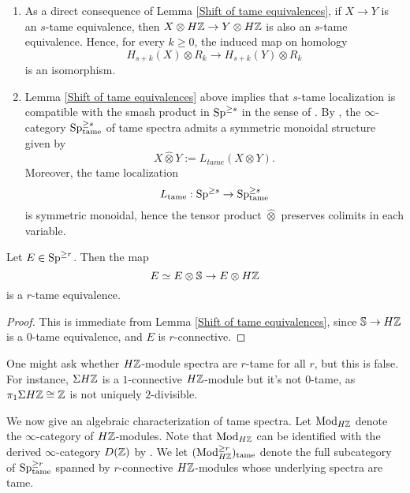 \begin{remark}
\label{symmetric monoidal structure on tame spectra}
\begin{enumerate}

 	\item As a direct consequence of Lemma \ref{Shift of tame equivalences}, if $X\to Y$ is an $s$-tame equivalence, then $X\otimes H{\mathbb{Z}} \to Y\otimes H{\mathbb{Z}}$ is also an $s$-tame equivalence. Hence, for every $k\geq 0$, the induced map on homology
 	\[
 	H_{s+k}(X)\otimes R_{k}
 	\to
 	H_{s+k}(Y)\otimes R_{k}
 	\]
 	is an isomorphism.
	\item Lemma \ref{Shift of tame equivalences} above implies that $s$-tame localization is compatible with the smash product in $\operatorname{Sp}^{\geq s}$ in the sense of \cite[Definition 2.2.1.6.]{HA}. By \cite[Proposition 2.2.1.9.]{HA}, the $\infty$-category $\operatorname{Sp}^{\geq s}_{\operatorname{\operatorname{tame}}}$ of tame spectra admits a symmetric monoidal structure given by 
$$
X\hat{\otimes} Y := L_{tame}(X\otimes Y).
$$
Moreover, the tame localization 
$$
L_{\operatorname{\operatorname{tame}}}: \operatorname{Sp}^{\geq s} \to 
\operatorname{Sp}^{\geq s}_{\operatorname{\operatorname{tame}}}
$$
is symmetric monoidal, hence the tensor product $\hat{\otimes}$ preserves colimits in each variable.
\end{enumerate}

\end{remark}

\begin{corollary}
\label{HZ commutes with tame localization}
	Let $E\in \operatorname{Sp}^{\geq r}$. Then the map
	$$
	E \simeq E\otimes {\mathbb{S}}  \to E\otimes H{\mathbb{Z}}
	$$ 
	is a $r$-tame equivalence.
\end{corollary}
\begin{proof}
	This is immediate from Lemma \ref{Shift of tame equivalences}, since ${\mathbb{S}} \to H{\mathbb{Z}}$ is a $0$-tame equivalence, and $E$ is $r$-connective.
\end{proof}



One might ask whether $H{\mathbb{Z}}$-module spectra are $r$-tame for all $r$, but this is false. For instance, $\Sigma H{\mathbb{Z}}$ is a $1$-connective $H{\mathbb{Z}}$-module but it's not $0$-tame, as $\pi_{1}\Sigma H{\mathbb{Z}}\cong {\mathbb{Z}}$ is not uniquely $2$-divisible.

We now give an algebraic characterization of tame spectra. 
Let $\operatorname{Mod}_{H{\mathbb{Z}}}$ denote the $\infty$-category of $H{\mathbb{Z}}$-modules. Note that $\operatorname{Mod}_{H{\mathbb{Z}}}$ can be identified with the derived $\infty$-category $D({\mathbb{Z}})$ by \cite[Remark 7.1.1.16.]{HA}.
We let $(\operatorname{Mod}^{\geq r}_{H{\mathbb{Z}}})_{\operatorname{\operatorname{tame}}}$ denote the full subcategory of $\operatorname{Sp}^{\geq r}_{\operatorname{\operatorname{tame}}}$ spanned by $r$-connective $H{\mathbb{Z}}$-modules whose underlying spectra are tame.

